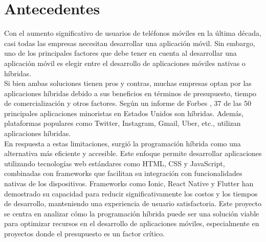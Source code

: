 \section{Antecedentes}

Con el aumento significativo de usuarios de teléfonos móviles en la última
década, casi todas las empresas necesitan desarrollar una aplicación móvil.
Sin embargo, uno de los principales factores que debe tener en cuenta al
desarrollar una aplicación móvil es elegir entre el desarrollo de aplicaciones
móviles nativas o híbridas. \parencite{turing-hibrid-development} \\

Si bien ambas soluciones tienen pros y contras, muchas empresas optan por
las aplicaciones híbridas debido a sus beneficios en términos de presupuesto,
tiempo de comercialización y otros factores. Según un informe de Forbes \parencite{forbes-hibrid-development},
37 de las 50 principales aplicaciones minoristas en Estados Unidos son híbridas.
Además, plataformas populares como Twitter, Instagram, Gmail, Uber, etc.,
utilizan aplicaciones híbridas.\\

En respuesta a estas limitaciones, surgió la programación híbrida como una
alternativa más eficiente y accesible. Este enfoque permite desarrollar
aplicaciones utilizando tecnologías web estándares como HTML, CSS y JavaScript,
combinadas con frameworks que facilitan su integración con funcionalidades
nativas de los dispositivos. Frameworks como Ionic, React Native y Flutter
han demostrado su capacidad para reducir significativamente los costos
y los tiempos de desarrollo, manteniendo una experiencia de usuario satisfactoria.
Este proyecto se centra en analizar cómo la programación híbrida puede ser
una solución viable para optimizar recursos en el desarrollo de aplicaciones
móviles, especialmente en proyectos donde el presupuesto es un factor crítico.
